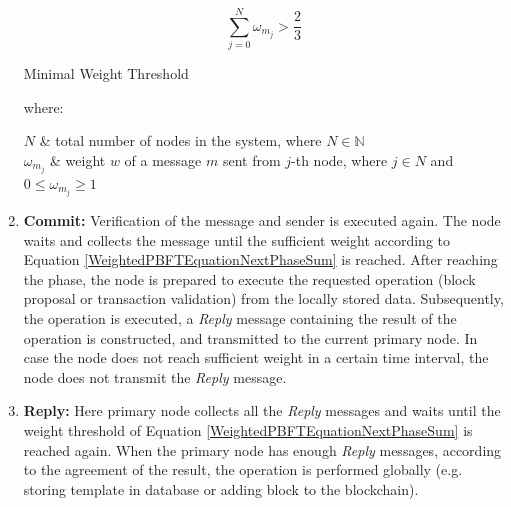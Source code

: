 \begin{enumerate}
    \begin{equation}
        \sum_{j=0}^{N} \omega_{m_{j}} > \frac{2}{3}
        \label{WeightedPBFTEquationNextPhaseSum}
    \end{equation}
    \begin{center}
        Minimal Weight Threshold
    \end{center}
    where:
    \begin{conditions}
     $N$     &  total number of nodes in the system, where $N \in \mathbb{N}$\\
     $\omega_{m_{j}}$     &  weight $w$ of a message $m$ sent from $j$-th node, where $j \in N$ and $0\leq\omega_{m_{j}}\geq1$
    \end{conditions}
    
    \item \textbf{Commit:} Verification of the message and sender is executed again. The node waits and collects the  message until the sufficient weight according to Equation \ref{WeightedPBFTEquationNextPhaseSum} is reached. After reaching the  phase, the node is prepared to execute the requested operation (block proposal or transaction validation) from the locally stored data. Subsequently, the operation is executed, a \emph{Reply} message containing the result of the operation is constructed, and transmitted to the current primary node. In case the node does not reach sufficient weight in a certain time interval, the node does not transmit the \emph{Reply} message.
    \item \textbf{Reply:} Here primary node collects all the \emph{Reply} messages and waits until the weight threshold of Equation \ref{WeightedPBFTEquationNextPhaseSum} is reached again. When the primary node has enough \emph{Reply} messages, according to the agreement of the result, the operation is performed globally (e.g. storing template in database or adding block to the blockchain). 
\end{enumerate}


